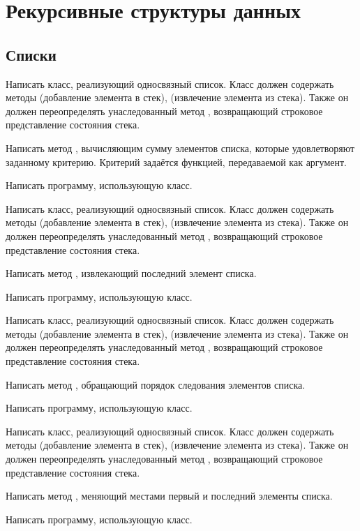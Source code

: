 \section{Рекурсивные структуры данных}

\subsection{Списки}

\task Написать класс, реализующий односвязный список. Класс должен
содержать методы  (добавление элемента в стек), 
(извлечение элемента из стека). Также он должен переопределять
унаследованный метод , возвращающий строковое
представление состояния стека.

Написать метод , вычисляющим сумму элементов списка, которые
удовлетворяют заданному критерию. Критерий задаётся функцией,
передаваемой как аргумент.

Написать программу, использующую класс.

\task Написать класс, реализующий односвязный список. Класс должен
содержать методы  (добавление элемента в стек), 
(извлечение элемента из стека). Также он должен переопределять
унаследованный метод , возвращающий строковое
представление состояния стека.

Написать метод , извлекающий последний элемент списка.

Написать программу, использующую класс.

\task Написать класс, реализующий односвязный список. Класс должен
содержать методы  (добавление элемента в стек), 
(извлечение элемента из стека). Также он должен переопределять
унаследованный метод , возвращающий строковое
представление состояния стека.

Написать метод , обращающий порядок следования элементов
списка.

Написать программу, использующую класс.

\task Написать класс, реализующий односвязный список. Класс должен
содержать методы  (добавление элемента в стек), 
(извлечение элемента из стека). Также он должен переопределять
унаследованный метод , возвращающий строковое
представление состояния стека.

Написать метод , меняющий местами первый и последний
элементы списка.

Написать программу, использующую класс.

